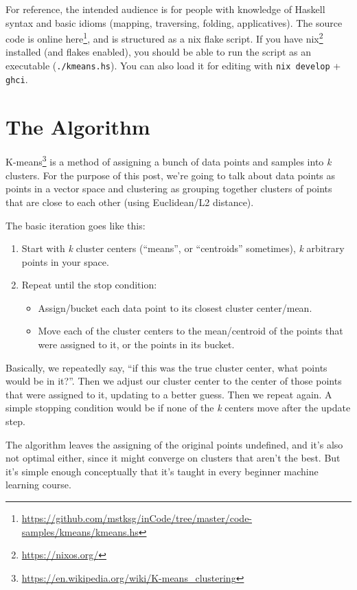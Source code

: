 \documentclass[]{article}
\renewcommand{\href}[2]{#2\footnote{\url{#1}}}
\begin{document}
For reference, the intended audience is for people with knowledge of Haskell
syntax and basic idioms (mapping, traversing, folding, applicatives). The source
code
\href{https://github.com/mstksg/inCode/tree/master/code-samples/kmeans/kmeans.hs}{is
online here}, and is structured as a nix flake script. If you have
\href{https://nixos.org/}{nix} installed (and flakes enabled), you should be
able to run the script as an executable (\texttt{./kmeans.hs}). You can also
load it for editing with \texttt{nix\ develop} + \texttt{ghci}.

\section{The Algorithm}\label{the-algorithm}

\href{https://en.wikipedia.org/wiki/K-means_clustering}{K-means} is a method of
assigning a bunch of data points and samples into \emph{k} clusters. For the
purpose of this post, we're going to talk about data points as points in a
vector space and clustering as grouping together clusters of points that are
close to each other (using Euclidean/L2 distance).

The basic iteration goes like this:

\begin{enumerate}
\def\labelenumi{\arabic{enumi}.}
\tightlist
\item
  Start with \emph{k} cluster centers (``means'', or ``centroids'' sometimes),
  \emph{k} arbitrary points in your space.
\item
  Repeat until the stop condition:

  \begin{itemize}
  \tightlist
  \item
    Assign/bucket each data point to its closest cluster center/mean.
  \item
    Move each of the cluster centers to the mean/centroid of the points that
    were assigned to it, or the points in its bucket.
  \end{itemize}
\end{enumerate}

Basically, we repeatedly say, ``if this was the true cluster center, what points
would be in it?''. Then we adjust our cluster center to the center of those
points that were assigned to it, updating to a better guess. Then we repeat
again. A simple stopping condition would be if none of the \emph{k} centers move
after the update step.

The algorithm leaves the assigning of the original points undefined, and it's
also not optimal either, since it might converge on clusters that aren't the
best. But it's simple enough conceptually that it's taught in every beginner
machine learning course.
\end{document}
